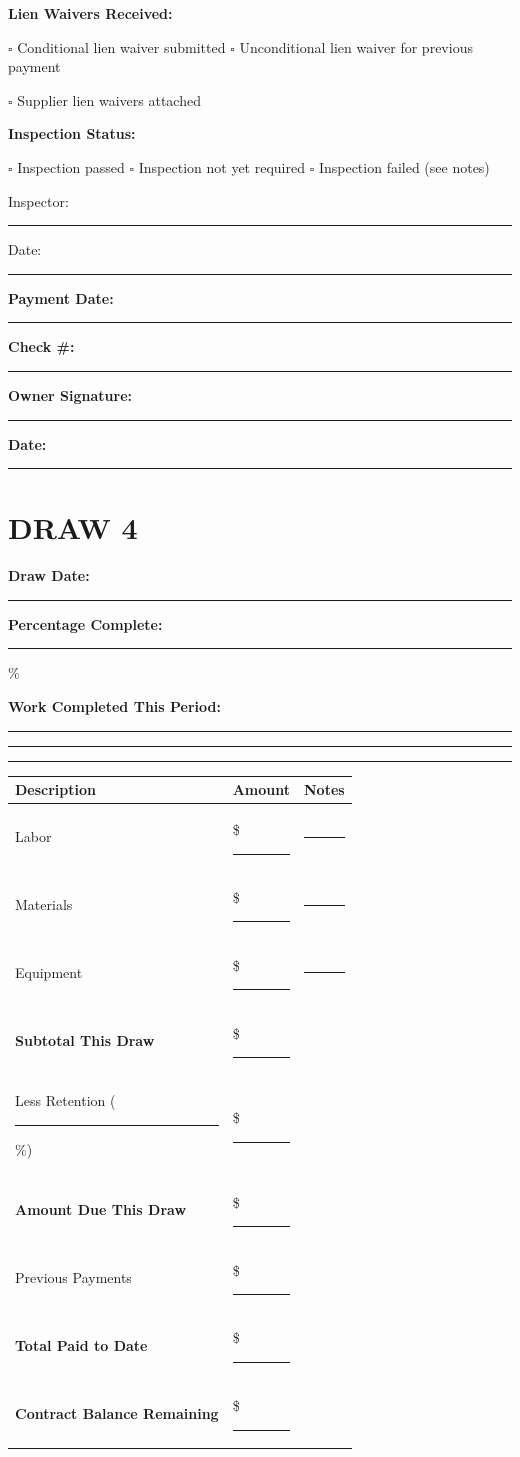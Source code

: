 \documentclass[11pt,letterpaper]{article}
\begin{document}
\vspace{6pt}

\textbf{Lien Waivers Received:}

$\square$ Conditional lien waiver submitted \hspace{0.3in} $\square$ Unconditional lien waiver for previous payment

$\square$ Supplier lien waivers attached

\textbf{Inspection Status:}

$\square$ Inspection passed \hspace{0.3in} $\square$ Inspection not yet required \hspace{0.3in} $\square$ Inspection failed (see notes)

Inspector: \rule{5cm}{0.4pt} Date: \rule{3cm}{0.4pt}

\textbf{Payment Date:} \rule{4cm}{0.4pt} \hspace{0.3in} \textbf{Check \#:} \rule{3cm}{0.4pt}

\textbf{Owner Signature:} \rule{5cm}{0.4pt} \textbf{Date:} \rule{2cm}{0.4pt}

\newpage

\section*{DRAW 4}

\textbf{Draw Date:} \rule{4cm}{0.4pt} \hspace{0.5in} \textbf{Percentage Complete:} \rule{2cm}{0.4pt} \%

\textbf{Work Completed This Period:}

\rule{14cm}{0.4pt}

\rule{14cm}{0.4pt}

\rule{14cm}{0.4pt}

\begin{tabular}{|p{3in}|p{1.5in}|p{1.5in}|}
\hline
\textbf{Description} & \textbf{Amount} & \textbf{Notes} \\
\hline
Labor & \$ \rule{1in}{0.4pt} & \rule{1in}{0.4pt} \\
\hline
Materials & \$ \rule{1in}{0.4pt} & \rule{1in}{0.4pt} \\
\hline
Equipment & \$ \rule{1in}{0.4pt} & \rule{1in}{0.4pt} \\
\hline
\textbf{Subtotal This Draw} & \$ \rule{1in}{0.4pt} & \\
\hline
Less Retention (\rule{1cm}{0.4pt}\%) & \$ \rule{1in}{0.4pt} & \\
\hline
\textbf{Amount Due This Draw} & \$ \rule{1in}{0.4pt} & \\
\hline
Previous Payments & \$ \rule{1in}{0.4pt} & \\
\hline
\textbf{Total Paid to Date} & \$ \rule{1in}{0.4pt} & \\
\hline
\textbf{Contract Balance Remaining} & \$ \rule{1in}{0.4pt} & \\
\hline
\end{tabular}
\end{document}
